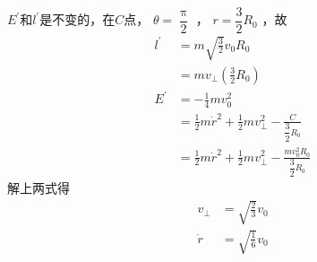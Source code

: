 \clearpage\noindent $ E ^ { \prime } $和$ l ^ { \prime } $是不变的，在$ C $点， $ \theta = \dfrac { \uppi } { 2 } $ ， $ r = \dfrac { 3 } { 2 } R _ { 0 } $ ，故
\begin{equation*}
  \begin{split}
    l ^ { \prime } &= m \sqrt { \frac { 3 } { 2 } } v _ { 0 } R _ { 0 } \\
    &= m v _ { \bot } \left( \frac { 3 } { 2 } R _ { 0 } \right) \\
    E ^ { \prime } &= - \frac { 1 } { 4 } m v _ 0 ^ { 2 } \\
    &= \frac { 1 } { 2 } m \dot { r } ^ { 2 } + \frac { 1 } { 2 } m v _ { \bot } ^ { 2 } - \frac { C } { \dfrac { 3 } { 2 } R _ { 0 } } \\
    &= \frac { 1 } { 2 } m \dot { r } ^ { 2 } + \frac { 1 } { 2 } m v _ { \bot } ^ { 2 } - \frac { m v _ 0 ^ 2 R _ 0 } { \dfrac { 3 } { 2 } R _ { 0 } }
  \end{split}
\end{equation*}
解上两式得
\begin{equation*}
  \begin{split}
    v _ { \bot } &= \sqrt { \frac { 2 } { 3 } } v _ { 0 } \\
    \dot { r } &= \sqrt { \frac { 1 } { 6 } } v _ { 0 }
  \end{split}
\end{equation*}
